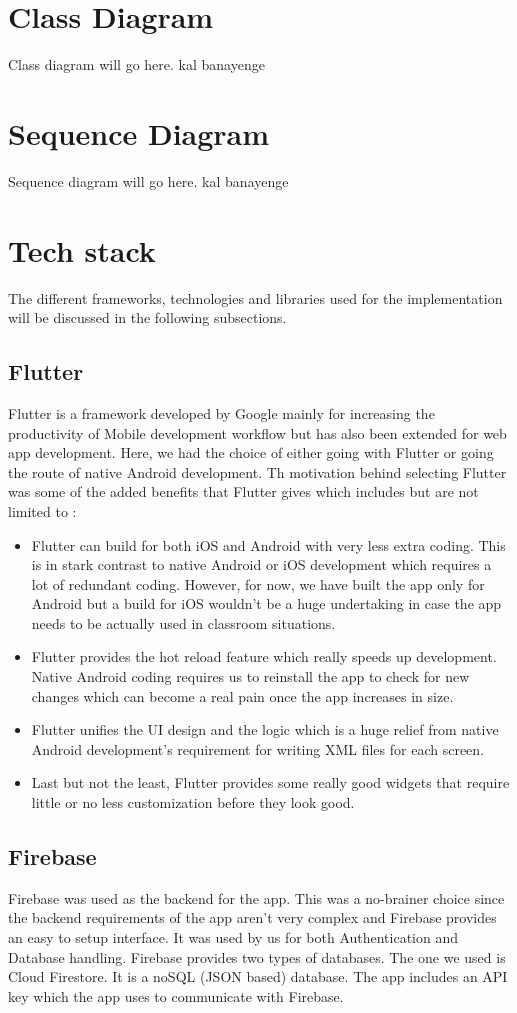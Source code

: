 \documentclass{article}
\begin{document}
\section{Class Diagram}
Class diagram will go here. kal banayenge

\section{Sequence Diagram} 
Sequence diagram will go here. kal banayenge

\section{Tech stack}
The different frameworks, technologies and libraries used for the implementation will be discussed in the following subsections.
\subsection{Flutter}
Flutter is a framework developed by Google mainly for increasing the productivity of Mobile development workflow but has also been extended for web app development. Here, we had the choice of either going with Flutter or going the route of native Android development. Th motivation behind selecting Flutter was some of the added benefits that Flutter gives which includes but are not limited to :
\begin{itemize}
    \item Flutter can build for both iOS and Android with very less extra coding. This is in stark contrast to native Android or iOS development which requires a lot of redundant coding. However, for now, we have built the app only for Android but a build for iOS wouldn't be a huge undertaking in case the app needs to be actually used in classroom situations.
    \item Flutter provides the hot reload feature which really speeds up development. Native Android coding requires us to reinstall the app to check for new changes which can become a real pain once the app increases in size.
    \item Flutter unifies the UI design and the logic which is a huge relief from native Android development's requirement for writing XML files for each screen.
    \item Last but not the least, Flutter provides some really good widgets that require little or no less customization before they look good.
\end{itemize}
\subsection{Firebase}
Firebase was used as the backend for the app. This was a no-brainer choice since the backend requirements of the app aren't very complex and Firebase provides an easy to setup interface. It was used by us for both Authentication and Database handling. Firebase provides two types of databases. The one we used is Cloud Firestore. It is a noSQL (JSON based) database. The app includes an API key which the app uses to communicate with Firebase.
\end{document}
